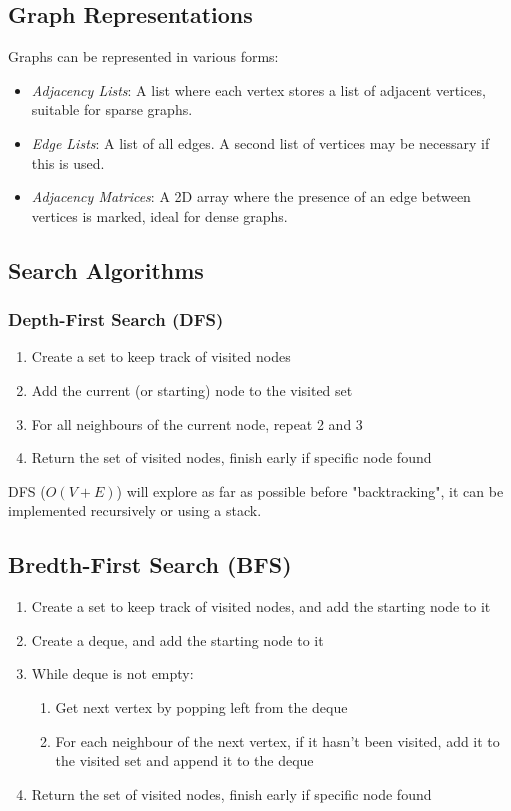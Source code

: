 \documentclass{article}
\begin{document}
\subsection{Graph Representations}
Graphs can be represented in various forms:
\begin{itemize}
    \item \textit{Adjacency Lists}: A list where each vertex stores a list of adjacent vertices, suitable for sparse graphs.
    \item \textit{Edge Lists}: A list of all edges. A second list of vertices may be necessary if this is used.
    \item \textit{Adjacency Matrices}: A 2D array where the presence of an edge between vertices is marked, ideal for dense graphs.
\end{itemize}

\subsection{Search Algorithms}

\subsubsection{Depth-First Search (DFS)}

\begin{enumerate}
    \item Create a set to keep track of visited nodes
    \item Add the current (or starting) node to the visited set
    \item For all neighbours of the current node, repeat 2 and 3
    \item Return the set of visited nodes, finish early if specific node found
\end{enumerate}

DFS ($O(V + E)$) will explore as far as possible before "backtracking", it can be implemented recursively or using a stack.

\subsection{Bredth-First Search (BFS)}

\begin{enumerate}
    \item Create a set to keep track of visited nodes, and add the starting node to it
    \item Create a deque, and add the starting node to it
    \item While deque is not empty:
    \begin{enumerate}
        \item Get next vertex by popping left from the deque
        \item For each neighbour of the next vertex, if it hasn't been visited, add it to the visited set and append it to the deque
    \end{enumerate}
    \item Return the set of visited nodes, finish early if specific node found
\end{enumerate}
\end{document}
